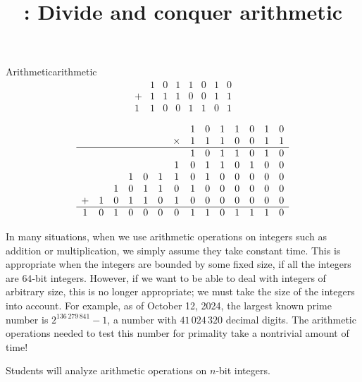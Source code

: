 \documentclass{tufte-handout}
\title{\thecourse: Divide and conquer arithmetic}
\date{}
\begin{document}
\maketitle


\begin{model*}{Arithmetic}{arithmetic}
  \[
    \begin{array}{cccccccc}
         & 1 & 0 & 1 & 1 & 0 & 1 & 0 \\
       + & 1 & 1 & 1 & 0 & 0 & 1 & 1 \\
      \hline
       1 & 1 & 0 & 0 & 1 & 1 & 0 & 1
    \end{array}
  \] \vspace{0.3in}

  \[
    \begin{array}{cccccccccccccc}
  & & & & & & &1&0&1&1&0&1&0 \\
  & & & & & &\times&1&1&1&0&0&1&1 \\
  \hline
  & & & & & & &1&0&1&1&0&1&0 \\
  & & & & & &1&0&1&1&0&1&0&0 \\
  & & &1&0&1&1&0&1&0&0&0&0&0 \\
  & &1&0&1&1&0&1&0&0&0&0&0&0 \\
 +&1&0&1&1&0&1&0&0&0&0&0&0&0 \\
 \hline
 1&0&1&0&0&0&0&1&1&0&1&1&1&0
    \end{array}
  \] \vspace{0.3in}
\end{model*}

In many situations, when we use arithmetic operations on integers such
as addition or multiplication, we simply assume they take constant
time.  This is appropriate when the integers are bounded by some fixed
size, \eg if all the integers are $64$-bit integers.  However, if we
want to be able to deal with integers of arbitrary size, this is no
longer appropriate; we must take the size of the integers into
account.  For example, as of October 12, 2024, the largest
known prime number is $2^{136\,279\,841} - 1$, a number with
$41\,024\,320$ decimal digits.  The arithmetic operations needed to
test this number for primality take a nontrivial amount of time!

\begin{objective}
  Students will analyze arithmetic operations on $n$-bit integers.
\end{objective}
\end{document}
